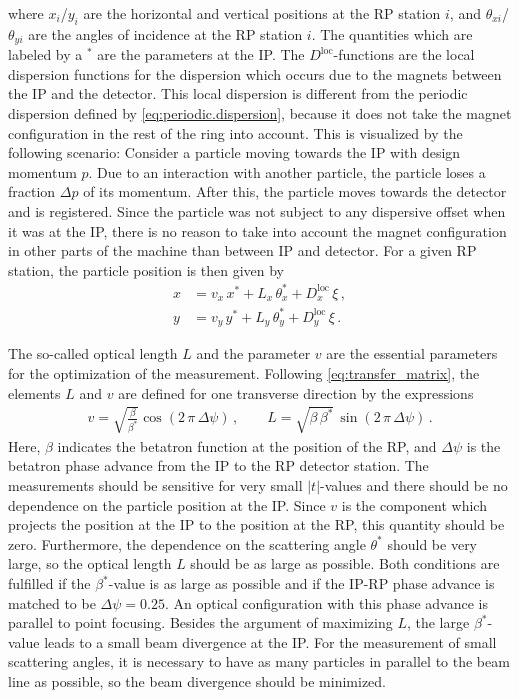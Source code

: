 where $x_i$/$y_i$ are the horizontal and vertical positions at the RP station $i$, and $\theta_{xi}$/$\theta_{yi}$ are the angles of incidence at the RP station $i$. The quantities which are labeled by a $^*$ are the parameters at the IP. The $D^\text{loc}$-functions are the local dispersion functions for the dispersion which occurs due to the magnets between the IP and the detector. This local dispersion is different from the periodic dispersion defined by \eqref{eq:periodic.dispersion}, because it does not take the magnet configuration in the rest of the ring into account. This is visualized by the following scenario: Consider a particle moving towards the IP with design momentum $p$. Due to an interaction with another particle, the particle loses a fraction $\Delta p$ of its momentum. After this, the particle moves towards the detector and is registered. Since the particle was not subject to any dispersive offset when it was at the IP, there is no reason to take into account the magnet configuration in other parts of the machine than between IP and detector.
\newpage
For a given RP station, the particle position is then given by
\begin{align}
x &= v_{x} \, x^* + L_{x} \, \theta_{x}^* + D_x^\text{loc} \, \xi \, , \\
y &= v_{y} \, y^* + L_{y} \, \theta_{y}^* + D_y^\text{loc} \, \xi \, . 
\end{align}

The so-called optical length $L$ and the parameter $v$ are the essential parameters for the optimization of the measurement. Following \eqref{eq:transfer_matrix}, the elements $L$ and $v$ are defined for one transverse direction by the expressions
\begin{align}
v = \sqrt{\frac{\beta}{\beta^*}} \cos \left( 2 \, \pi \, \Delta \psi \right) \, , \quad \quad 
L = \sqrt{ \beta \, \beta^* } \, \sin \left( 2 \, \pi \, \Delta \psi \right) \, .
\end{align}
Here, $\beta$ indicates the betatron function at the position of the RP, and $\Delta \psi$ is the betatron phase advance from the IP to the RP detector station. The measurements should be sensitive for very small $|t|$-values and there should be no dependence on the particle position at the IP. Since $v$ is the component which projects the position at the IP to the position at the RP, this quantity should be zero. Furthermore, the dependence on the scattering angle $\theta^*$ should be very large, so the optical length $L$ should be as large as possible. Both conditions are fulfilled if the \mbox{$\beta^*$-value} is as large as possible and if the IP-RP phase advance is matched to be $\Delta \psi = 0.25$. An optical configuration with this phase advance is parallel to point focusing. Besides the argument of maximizing $L$, the large $\beta^*$-value leads to a small beam divergence at the IP. For the measurement of small scattering angles, it is necessary to have as many particles in parallel to the beam line as possible, so the beam divergence should be minimized.
%
%
%
